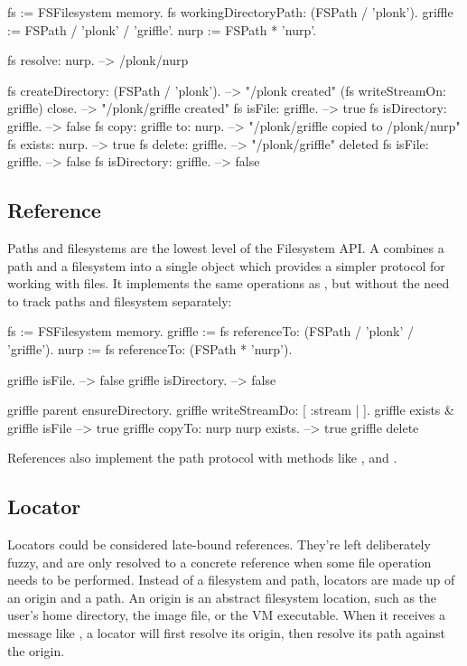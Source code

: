 \documentclass[a4paper,10pt,twoside]{book}
\begin{document}
\begin{code}{}
fs := FSFilesystem memory.
fs workingDirectoryPath: (FSPath / 'plonk').
griffle := FSPath / 'plonk' / 'griffle'.
nurp := FSPath * 'nurp'.
    
fs resolve: nurp.            --> /plonk/nurp
    
fs createDirectory: (FSPath / 'plonk').  --> "/plonk created"
(fs writeStreamOn: griffle) close.  --> "/plonk/griffle created"
fs isFile: griffle.         --> true
fs isDirectory: griffle.         --> false
fs copy: griffle to: nurp.       --> "/plonk/griffle copied to /plonk/nurp"
fs exists: nurp.             --> true
fs delete: griffle.          --> "/plonk/griffle" deleted
fs isFile: griffle.          --> false
fs isDirectory: griffle.         --> false
\end{code}
	
\subsection{Reference}

Paths and filesystems are the lowest level of the Filesystem API. A  combines a path and a filesystem into a single object which provides a simpler protocol for working with files. It implements the same operations as , but without the need to track paths and filesystem separately:


\begin{code}{}
fs := FSFilesystem memory.
griffle := fs referenceTo: (FSPath / 'plonk' / 'griffle').
nurp := fs referenceTo: (FSPath * 'nurp').
    
griffle isFile.				--> false
griffle isDirectory. 		--> false
    
griffle parent ensureDirectory.
griffle writeStreamDo: [ :stream | ].
griffle exists & griffle isFile		--> true
griffle copyTo: nurp
nurp exists.				--> true
griffle delete              
\end{code}    

References also implement the path protocol with methods like \ct{/},  and .

\subsection{Locator}

Locators could be considered late-bound references. They're left deliberately fuzzy, and are only resolved to a concrete reference when some file operation needs to be performed. Instead of a filesystem and path, locators are made up of an origin and a path. An origin is an abstract filesystem location, such as the user's home directory, the image file, or the VM executable. When it receives a message like , a locator will first resolve its origin, then resolve its path against the origin.
\end{document}
